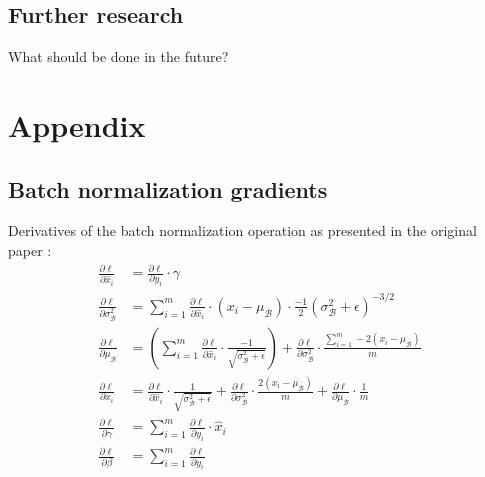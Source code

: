 \documentclass[a4paper,11pt]{article} %
\begin{document}
\subsection{Further research}
What should be done in the future?

\newpage



\newpage
\section{Appendix}
\subsection{Batch normalization gradients} \label{appendix:batch-norm-grad}
Derivatives of the batch normalization operation as presented in the original paper \cite{ioffe2015batch}:
\begin{equation}
  \begin{aligned}
    \frac{\partial \ell}{\partial \widehat{x}_{i}} &=\frac{\partial \ell}{\partial y_{i}} \cdot \gamma \\
    \frac{\partial \ell}{\partial \sigma_{\mathcal{B}}^{2}} &=\sum_{i=1}^{m} \frac{\partial \ell}{\partial \widehat{x}_{i}} \cdot\left(x_{i}-\mu_{\mathcal{B}}\right) \cdot \frac{-1}{2}\left(\sigma_{\mathcal{B}}^{2}+\epsilon\right)^{-3 / 2} \\
    \frac{\partial \ell}{\partial \mu_{\mathcal{B}}} &=\left(\sum_{i=1}^{m} \frac{\partial \ell}{\partial \widehat{x}_{i}} \cdot \frac{-1}{\sqrt{\sigma_{\mathcal{B}}^{2}+\epsilon}}\right)+\frac{\partial \ell}{\partial \sigma_{\mathcal{B}}^{2}} \cdot \frac{\sum_{i=1}^{m}-2\left(x_{i}-\mu_{\mathcal{B}}\right)}{m} \\
    \frac{\partial \ell}{\partial x_{i}} &=\frac{\partial \ell}{\partial \widehat{x}_{i}} \cdot \frac{1}{\sqrt{\sigma_{\mathcal{B}}^{2}+\epsilon}}+\frac{\partial \ell}{\partial \sigma_{\mathcal{B}}^{2}} \cdot \frac{2\left(x_{i}-\mu_{\mathcal{B}}\right)}{m}+\frac{\partial \ell}{\partial \mu_{\mathcal{B}}} \cdot \frac{1}{m} \\
    \frac{\partial \ell}{\partial \gamma} &=\sum_{i=1}^{m} \frac{\partial \ell}{\partial y_{i}} \cdot \widehat{x}_{i} \\
    \frac{\partial \ell}{\partial \beta} &=\sum_{i=1}^{m} \frac{\partial \ell}{\partial y_{i}}
  \end{aligned}
\end{equation}
\end{document}
